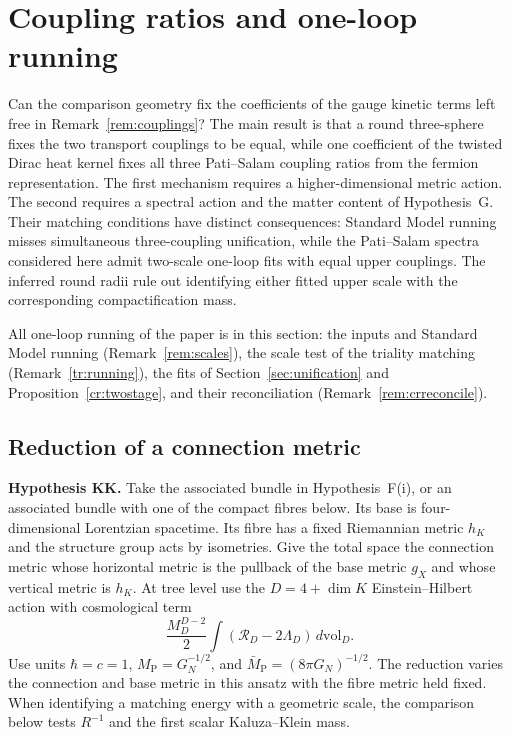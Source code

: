 \documentclass[aps,pra,onecolumn,superscriptaddress,nofootinbib,10pt]{revtex4-2}
\theoremstyle{definition}
\theoremstyle{remark}
\begin{document}
\section{Coupling ratios and one-loop running}\label{sec:couplings}

Can the comparison geometry fix the coefficients of the gauge kinetic
terms left free in Remark~\ref{rem:couplings}? The main result is that a
round three-sphere fixes the two transport couplings to be equal, while
one coefficient of the twisted Dirac heat kernel fixes all three
Pati--Salam coupling ratios from the fermion representation. The first
mechanism requires a higher-dimensional metric action. The second
requires a spectral action and the matter content of Hypothesis~G.
Their matching conditions have distinct consequences: Standard Model
running misses simultaneous three-coupling unification, while the
Pati--Salam spectra considered here admit two-scale one-loop
fits with equal upper couplings. The inferred round radii
rule out identifying either fitted upper scale with the
corresponding compactification mass.

All one-loop running of the paper is in this section: the inputs and Standard Model running
(Remark~\ref{rem:scales}), the scale test of the triality matching (Remark~\ref{tr:running}), the fits of
Section~\ref{sec:unification} and Proposition~\ref{cr:twostage}, and their reconciliation (Remark~\ref{rem:crreconcile}).

\subsection{Reduction of a connection metric}

\smallskip\noindent\textbf{Hypothesis KK.}\label{hyp:KK}  Take the associated bundle in Hypothesis~F(i), or an associated bundle
with one of the compact fibres below. Its base is four-dimensional
Lorentzian spacetime. Its fibre has a fixed Riemannian metric $h_K$ and
the structure group acts by isometries. Give the total space the connection
metric whose horizontal metric is the pullback of the base metric $g_X$
and whose vertical metric is $h_K$. At tree level use the
$D=4+\dim K$ Einstein--Hilbert action with cosmological term
\[
 \frac{M_D^{D-2}}{2}\int(\mathcal R_D-2\Lambda_D)\,d\mathrm{vol}_D.
\]
Use units $\hbar=c=1$, $M_{\mathrm P}=G_N^{-1/2}$, and
$\bar M_{\mathrm P}=(8\pi G_N)^{-1/2}$. The reduction varies the
connection and base metric in this ansatz with the fibre metric held
fixed. When identifying a matching energy with a geometric scale, the
comparison below tests $R^{-1}$ and the first scalar Kaluza--Klein mass.
\end{document}
